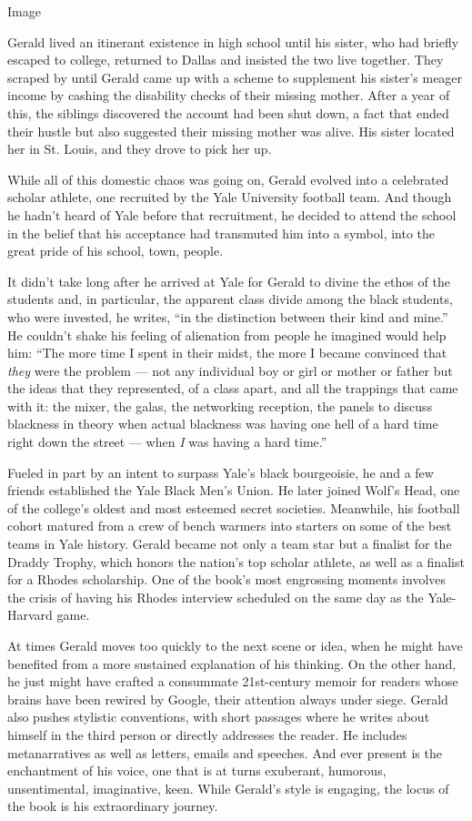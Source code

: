 Image

Gerald lived an itinerant existence in high school until his sister, who
had briefly escaped to college, returned to Dallas and insisted the two
live together. They scraped by until Gerald came up with a scheme to
supplement his sister's meager income by cashing the disability checks
of their missing mother. After a year of this, the siblings discovered
the account had been shut down, a fact that ended their hustle but also
suggested their missing mother was alive. His sister located her in St.
Louis, and they drove to pick her up.

While all of this domestic chaos was going on, Gerald evolved into a
celebrated scholar athlete, one recruited by the Yale University
football team. And though he hadn't heard of Yale before that
recruitment, he decided to attend the school in the belief that his
acceptance had transmuted him into a symbol, into the great pride of his
school, town, people.

It didn't take long after he arrived at Yale for Gerald to divine the
ethos of the students and, in particular, the apparent class divide
among the black students, who were invested, he writes, ``in the
distinction between their kind and mine.'' He couldn't shake his feeling
of alienation from people he imagined would help him: ``The more time I
spent in their midst, the more I became convinced that \emph{they} were
the problem --- not any individual boy or girl or mother or father but
the ideas that they represented, of a class apart, and all the trappings
that came with it: the mixer, the galas, the networking reception, the
panels to discuss blackness in theory when actual blackness was having
one hell of a hard time right down the street --- when \emph{I} was
having a hard time.''

Fueled in part by an intent to surpass Yale's black bourgeoisie, he and
a few friends established the Yale Black Men's Union. He later joined
Wolf's Head, one of the college's oldest and most esteemed secret
societies. Meanwhile, his football cohort matured from a crew of bench
warmers into starters on some of the best teams in Yale history. Gerald
became not only a team star but a finalist for the Draddy Trophy, which
honors the nation's top scholar athlete, as well as a finalist for a
Rhodes scholarship. One of the book's most engrossing moments involves
the crisis of having his Rhodes interview scheduled on the same day as
the Yale-Harvard game.

At times Gerald moves too quickly to the next scene or idea, when he
might have benefited from a more sustained explanation of his thinking.
On the other hand, he just might have crafted a consummate 21st-century
memoir for readers whose brains have been rewired by Google, their
attention always under siege. Gerald also pushes stylistic conventions,
with short passages where he writes about himself in the third person or
directly addresses the reader. He includes metanarratives as well as
letters, emails and speeches. And ever present is the enchantment of his
voice, one that is at turns exuberant, humorous, unsentimental,
imaginative, keen. While Gerald's style is engaging, the locus of the
book is his extraordinary journey.

